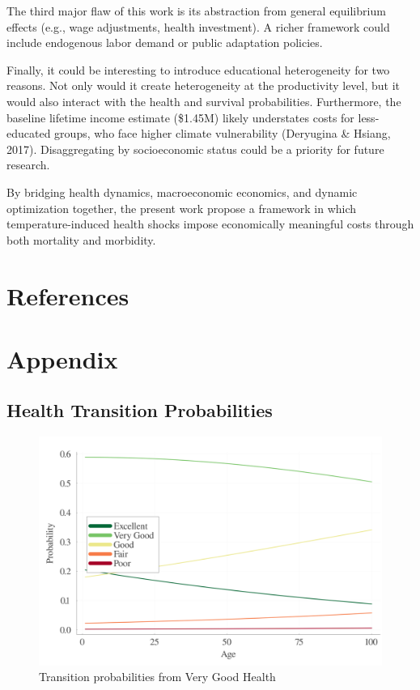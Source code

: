 \documentclass{article}
\begin{document}
The third major flaw of this work is its abstraction from general equilibrium effects (e.g., wage adjustments, health investment).
A richer framework could include endogenous labor demand or public adaptation policies.

Finally, it could be interesting to introduce educational heterogeneity for two reasons. 
Not only would it create heterogeneity at the productivity level, but it would also interact with 
the health and survival probabilities.
Furthermore, the baseline lifetime income estimate (\$1.45M) likely understates costs for less-educated groups, who face higher climate vulnerability (Deryugina \& Hsiang, 2017).
Disaggregating by socioeconomic status could be a priority for future research.

By bridging health dynamics, macroeconomic economics, and dynamic optimization together,
the present work propose a framework in which temperature-induced health shocks impose
economically meaningful costs through both mortality and morbidity.

\section{References}

\printbibliography

\newpage
\section{Appendix}

\subsection{Health Transition Probabilities}

\begin{figure}[H]\label{fig:health_transition_2}
    \begin{center}
        \includegraphics[width=0.4\linewidth]{output/health_transition_2.png}
        \caption{Transition probabilities from Very Good Health}    
    \end{center}
\end{figure}
\end{document}
